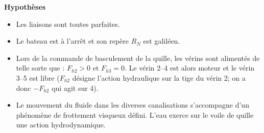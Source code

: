 \begin{multicols}{2}
\ifprof
\else
%



\textbf{Hypothèses}

\begin{itemize}
\item Les liaisons sont toutes parfaites.
\item Le bateau est à l’arrêt et son repère $R_N$ est galiléen.
\item Lors de la commande de basculement de la quille, les vérins sont alimentés de telle sorte que : $F_{h2} > 0$ et
$F_{h3} = 0$. Le vérin 2--4 est alors moteur et le vérin 3--5 est libre ($F_{h2}$ désigne l'action hydraulique sur la tige du vérin 2; on a donc $-F_{h2}$ qui agit sur 4).
\item Le mouvement du fluide dans les diverses canalisations s’accompagne d’un phénomène de frottement visqueux défini. L’eau exerce sur le voile de quille une action hydrodynamique.
\end{itemize}


\end{multicols}
